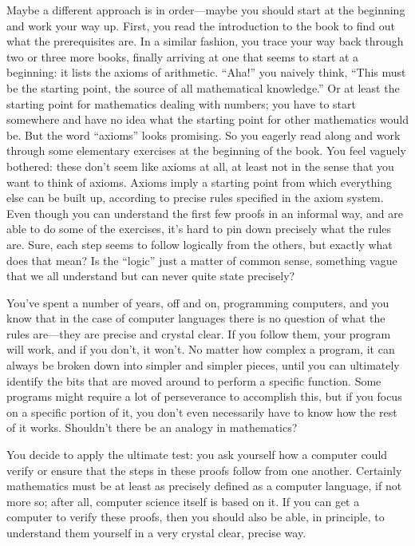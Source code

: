 Maybe a different approach is in order---maybe you should start at the
beginning and work your way up.  First, you read the introduction to the book
to find out what the prerequisites are.  In a similar fashion, you trace your
way back through two or three more books, finally arriving at one that seems
to start at a beginning:  it lists the axioms of arithmetic.  ``Aha!'' you
naively think, ``This must be the starting point, the source of all mathematical
knowledge.'' Or at least the starting point for mathematics dealing with
numbers; you have to start somewhere and have no idea what the starting point
for other mathematics would be.  But the word ``axioms'' looks promising.  So
you eagerly read along and work through some elementary exercises at the
beginning of the book.  You feel vaguely bothered:  these
don't seem like axioms at all, at least not in the sense that you want to
think of axioms.  Axioms imply a starting point from which everything else can
be built up, according to precise rules specified in the axiom system.  Even
though you can understand the first few proofs in an informal way,
and are able to do some of the
exercises, it's hard to pin down precisely what the
rules are.   Sure, each step seems to follow logically from the others, but
exactly what does that mean?  Is the ``logic'' just a matter of common sense,
something vague that we all understand but can never quite state precisely?

You've spent a number of years, off and on, programming computers, and you
know that in the case of computer languages there is no question of what the
rules are---they are precise and crystal clear.  If you follow them, your
program will work, and if you don't, it won't.  No matter how complex a
program, it can always be broken down into simpler and simpler pieces, until
you can ultimately identify the bits that are moved around to perform a
specific function.  Some programs might require a lot of perseverance to
accomplish this, but if you focus on a specific portion of it, you don't even
necessarily have to know how the rest of it works. Shouldn't there be an
analogy in mathematics?

You decide to apply the ultimate test:  you ask yourself how a computer could
verify or ensure that the steps in these proofs follow from one another.
Certainly mathematics must be at least as precisely defined as a computer
language, if not more so; after all, computer science itself is based on it.
If you can get a computer to verify these proofs, then you should also be
able, in principle, to understand them yourself in a very crystal clear,
precise way.

